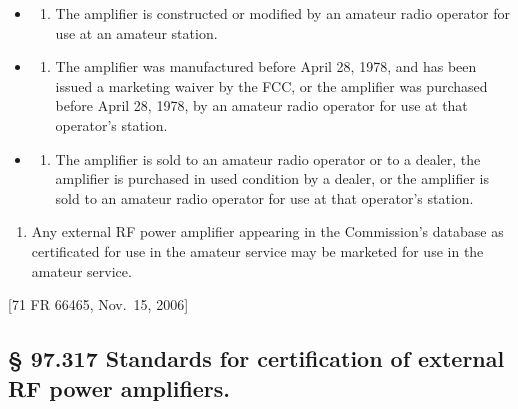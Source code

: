 \documentclass[
  letterpaper,
  DIV=11,
  numbers=noendperiod]{scrreport}
\providecommand{\tightlist}{%
  \setlength{\itemsep}{0pt}\setlength{\parskip}{0pt}}\usepackage{longtable,booktabs,array}
\begin{document}
\begin{itemize}
\item
  \begin{enumerate}
  \def\labelenumi{(\arabic{enumi})}
  \tightlist
  \item
    The amplifier is constructed or modified by an amateur radio
    operator for use at an amateur station.
  \end{enumerate}
\item
  \begin{enumerate}
  \def\labelenumi{(\arabic{enumi})}
  \setcounter{enumi}{1}
  \tightlist
  \item
    The amplifier was manufactured before April 28, 1978, and has been
    issued a marketing waiver by the FCC, or the amplifier was purchased
    before April 28, 1978, by an amateur radio operator for use at that
    operator's station.
  \end{enumerate}
\item
  \begin{enumerate}
  \def\labelenumi{(\arabic{enumi})}
  \setcounter{enumi}{2}
  \tightlist
  \item
    The amplifier is sold to an amateur radio operator or to a dealer,
    the amplifier is purchased in used condition by a dealer, or the
    amplifier is sold to an amateur radio operator for use at that
    operator's station.
  \end{enumerate}
\end{itemize}

\begin{enumerate}
\def\labelenumi{(\alph{enumi})}
\setcounter{enumi}{2}
\tightlist
\item
  Any external RF power amplifier appearing in the Commission's database
  as certificated for use in the amateur service may be marketed for use
  in the amateur service.
\end{enumerate}

{[}71 FR 66465, Nov.~15, 2006{]}

\hypertarget{standards-for-certification-of-external-rf-power-amplifiers.}{%
\subsection*{§ 97.317 Standards for certification of external RF power
amplifiers.}\label{standards-for-certification-of-external-rf-power-amplifiers.}}
\end{document}
